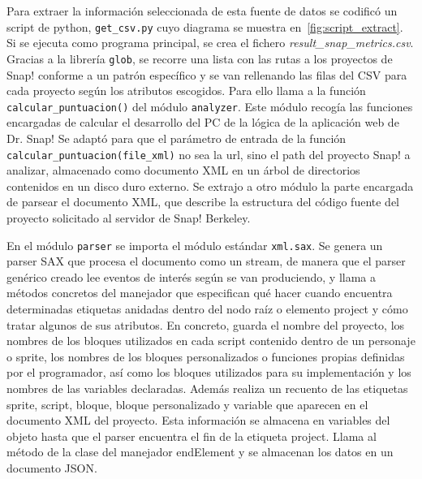 \documentclass[a4paper, 12pt]{book}
\begin{document}
Para extraer la información seleccionada de esta fuente de datos se codificó un script de python, \texttt{get\_csv.py} cuyo diagrama se muestra en~\ref{fig:script_extract}. Si se ejecuta como programa principal, se crea el fichero \emph{result\_snap\_metrics.csv}. Gracias a la librería \texttt{glob}, se recorre una lista con las rutas a los proyectos de Snap! conforme a un patrón específico y se van rellenando las filas del CSV para cada proyecto según los atributos escogidos. Para ello llama a la función \texttt{calcular\_puntuacion()} del módulo \texttt{analyzer}. Este módulo recogía las funciones encargadas de calcular el desarrollo del PC de la lógica de la aplicación web de Dr. Snap! Se adaptó para que el parámetro de entrada de la función \texttt{calcular\_puntuacion(file\_xml)} no sea la url, sino el path del proyecto Snap! a analizar, almacenado como documento XML en un árbol de directorios contenidos en un disco duro externo. Se extrajo a otro módulo la parte encargada de parsear el documento XML, que describe la estructura del código fuente del proyecto solicitado al servidor de Snap! Berkeley. 

En el módulo \texttt{parser} se importa el módulo estándar \texttt{xml.sax}. Se genera un parser SAX que procesa el documento como un stream, de manera que el parser genérico creado lee eventos de interés según se van produciendo, y llama a métodos concretos del manejador que especifican qué hacer cuando encuentra determinadas etiquetas anidadas dentro del nodo raíz o elemento project y cómo tratar algunos de sus atributos. En concreto, guarda el nombre del proyecto, los nombres de los bloques utilizados en cada script contenido dentro de un personaje o sprite, los nombres de los bloques personalizados o funciones propias definidas por el programador, así como los bloques utilizados para su implementación y los nombres de las variables declaradas. Además realiza un recuento de las etiquetas sprite, script, bloque, bloque personalizado y variable que aparecen en el documento XML del proyecto. Esta información se almacena en variables del objeto hasta que el parser encuentra el fin de la etiqueta project. Llama al método de la clase del manejador endElement y se almacenan los datos en un documento JSON.
\end{document}
